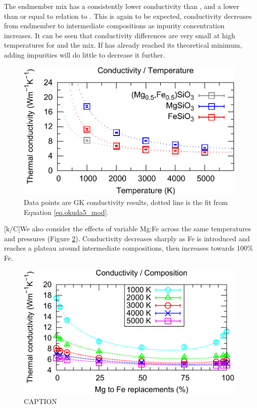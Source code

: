 The endmember mix has a consistently lower conductivity than \mgsio, and a lower than or equal to relation to \fesios. This is again to be expected, conductivity decreases from endmember to intermediate compositions as inpurity concentration increases. It can be seen that conductivity differences are very small at high temperatures for \fesios and the mix. If \fesios has already reached its theoretical minimum, adding impurities will do little to decrease it further.
%

\begin{figure}[h!]
  \includegraphics[width=\linewidth]{Figures/k-t_all_02.png}
  \caption{Data points are GK conductivity results, dotted line is the fit from Equation \ref{eq.okuda5_mod}.}
  \label{fig:kappa-temp_01}
\end{figure}

[k/C]We also consider the effects of variable Mg:Fe across the same temperatures and pressures (Figure \ref{fig:kappa-comp_01}). Conductivity decreases sharply as Fe is introduced and reaches a plateau around intermediate compositions, then increases towards 100\% Fe. 

\begin{figure}[h!]
  \includegraphics[width=\linewidth]{Figures/k-c_all_01.png}
  \caption{CAPTION}
  \label{fig:kappa-comp_01}
\end{figure}

